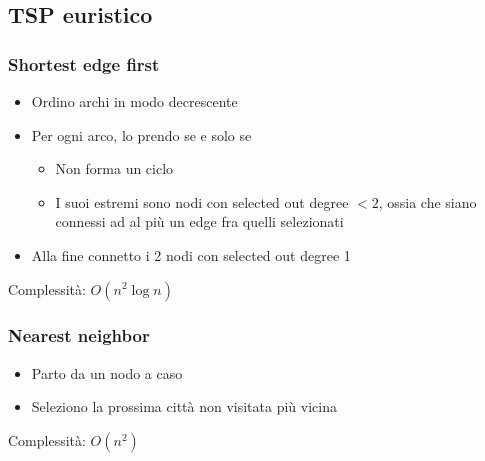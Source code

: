 \subsection{TSP euristico}
\subsubsection{Shortest edge first}
\begin{itemize}
	\item Ordino archi in modo decrescente
	\item Per ogni arco, lo prendo se e solo se
	      \begin{itemize}
		      \item Non forma un ciclo
		      \item I suoi estremi sono nodi con selected out degree $ < 2 $, ossia che siano connessi ad al più un edge fra quelli selezionati
	      \end{itemize}
	\item Alla fine connetto i 2 nodi con selected out degree 1
\end{itemize}
Complessità: $ O\left(n^2 \log n\right) $
\subsubsection{Nearest neighbor}
\begin{itemize}
	\item Parto da un nodo a caso
	\item Seleziono la prossima città non visitata più vicina
\end{itemize}
Complessità: $ O\left(n^2\right) $
